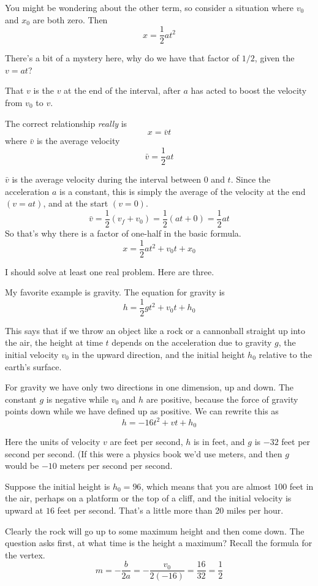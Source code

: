 \documentclass[11pt, oneside]{article}
\begin{document}
You might be wondering about the other term, so consider a situation where $v_0$ and $x_0$ are both zero.  Then
\[ x = \frac{1}{2}at^2 \]

There's a bit of a mystery here, why do we have that factor of $1/2$, given the $v = at$?  

That $v$ is the $v$ at the end of the interval, after $a$ has acted to boost the velocity from $v_0$ to $v$.

The correct relationship \emph{really} is
\[ x = \bar{v} t \]
where $\bar{v}$ is the average velocity
\[ \bar{v} = \frac{1}{2}at \]

$\bar{v}$ is the average velocity during the interval between $0$ and $t$.  Since the acceleration $a$ is a constant, this is simply the average of the velocity at the end $(v = at)$, and at the start $(v = 0)$.
\[ \bar{v} = \frac{1}{2} (v_f + v_0) = \frac{1}{2} (at + 0) = \frac{1}{2} at \]
So that's why there is a factor of one-half in the basic formula.
\[ x = \frac{1}{2}at^2 + v_0 t + x_0 \]

I should solve at least one real problem.  Here are three.  

My favorite example is gravity.  The equation for gravity is
\[ h = \frac{1}{2}g t^2 + v_0 t + h_0 \]

This says that if we throw an object like a rock or a cannonball straight up into the air, the height at time $t$ depends on the acceleration due to gravity $g$, the initial velocity $v_0$ in the upward direction, and the initial height $h_0$ relative to the earth's surface.

For gravity we have only two directions in one dimension, up and down.  The constant $g$ is negative while $v_0$ and $h$ are positive, because the force of gravity points down while we have defined up as positive.  We can rewrite this as
\[ h = -16t^2 + vt + h_0 \]

Here the units of velocity $v$ are feet per second, $h$ is in feet, and $g$ is $-32$ feet per second per second.  (If this were a physics book we'd use meters, and then $g$ would be $-10$ meters per second per second.

Suppose the initial height is $h_0 = 96$, which means that you are almost $100$ feet in the air, perhaps on a platform or the top of a cliff, and the initial velocity is upward at $16$ feet per second.  That's a little more than 20 miles per hour.

Clearly the rock will go up to some maximum height and then come down.  The question asks first, at what time is the height a maximum?  Recall the formula for the vertex.
\[ m = -\frac{b}{2a} = -\frac{v_0}{2(-16)} = \frac{16}{32} = \frac{1}{2} \]
\end{document}
